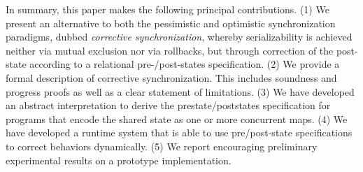 
In summary, this paper makes the following principal contributions.
  (1) We present an alternative to both the pessimistic and optimistic synchronization paradigms, dubbed \emph{corrective synchronization}, whereby serializability is achieved neither via mutual exclusion nor via rollbacks, but through correction of the post-state according to a relational pre-/post-states specification.
(2) We provide a formal description of corrective synchronization. This includes soundness and progress proofs as well as a clear statement of limitations.
	(3) We have developed an abstract interpretation to derive the prestate/poststates specification for programs that encode the shared state as one or more concurrent maps. 
(4) We have developed a runtime system that is able to use
pre/post-state specifications to correct behaviors dynamically.
%
(5) We report encouraging preliminary experimental results on
a prototype implementation.


